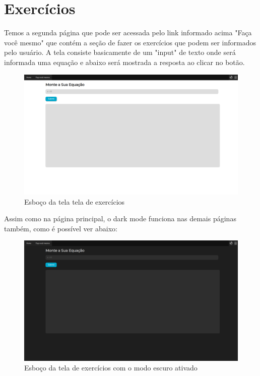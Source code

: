 \documentclass[12pt]{report}
\begin{document}
\section{Exercícios}
Temos a segunda página que pode ser acessada pelo link informado acima "Faça você mesmo" que contém a seção de fazer os exercícios que podem ser informados pelo usuário. A tela consiste basicamente de um "input" de texto onde será informada uma equação e abaixo será mostrada a resposta ao clicar no botão.

\begin{figure}[H]
    \includegraphics[width=1\textwidth]{img/interativo.png}
    \caption{Esboço da tela tela de exercícios}
\end{figure}

Assim como na página principal, o dark mode funciona nas demais páginas também, como é possível ver abaixo:

\begin{figure}[H]
    \includegraphics[width=1\textwidth]{img/interativo-dm.png}
    \caption{Esboço da tela de exercícios com o modo escuro ativado}
\end{figure}
\end{document}
